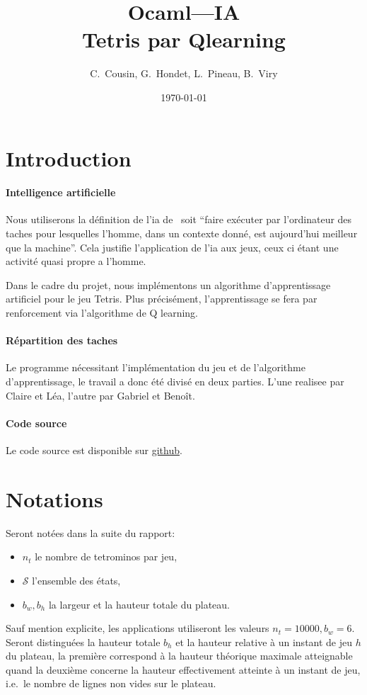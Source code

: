 \documentclass{report}
\title{Ocaml---IA\\Tetris par Qlearning}
\author{C.~Cousin, G.~Hondet, L.~Pineau, B.~Viry}
\date{\today}
\begin{document}
\maketitle
\tableofcontents

\section*{Introduction}
\paragraph{Intelligence artificielle}
Nous utiliserons la définition de l'ia de~\cite{schiex_alliot92} soit
``faire exécuter par l'ordinateur des taches pour lesquelles l'homme, dans un
contexte donné, est aujourd'hui meilleur que la machine''. Cela justifie
l'application de l'ia aux jeux, ceux ci étant une activité quasi propre a
l'homme.

Dans le cadre du projet, nous implémentons un algorithme d'apprentissage
artificiel pour le jeu Tetris. Plus précisément, l'apprentissage se fera par
renforcement via l'algorithme de Q learning.

\paragraph{Répartition des taches}
Le programme nécessitant l'implémentation du jeu et de l'algorithme
d'apprentissage, le travail a donc été divisé en deux parties. L'une realisee
par Claire et L\'ea, l'autre par Gabriel et Beno\^it.

\paragraph{Code source}
Le code source est disponible sur
\href{https://github.com/ViryBe/qai_tetris}{github}.


\section*{Notations}
Seront notées dans la suite du rapport:
\begin{itemize}
  \item \(n_t\) le nombre de tetrominos par jeu,
  \item \(\mathcal{S}\) l'ensemble des états,
  \item \(b_w, b_h\) la largeur et la hauteur totale du plateau.
\end{itemize}
Sauf mention explicite, les applications utiliseront les valeurs \(n_t=10000,
b_w = 6\). Seront distinguées la hauteur totale \(b_h\) et la hauteur relative
à un instant de jeu \(h\) du plateau, la première correspond à la hauteur
théorique maximale atteignable quand la deuxième concerne la hauteur
effectivement atteinte à un instant de jeu, i.e.\ le nombre de lignes non vides
sur le plateau.
\end{document}
